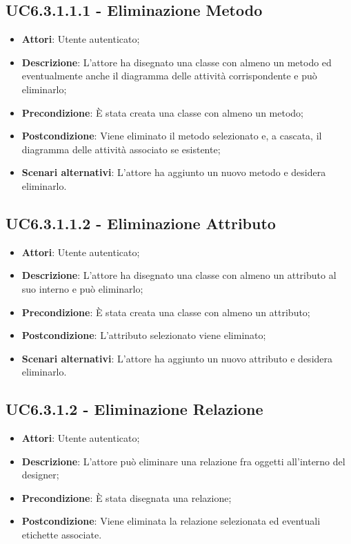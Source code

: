 \subsection{UC6.3.1.1.1 - Eliminazione Metodo} 
\label{ssec:UC6.3.1.1.1} 
\begin{itemize} 
\item \textbf{Attori}: Utente autenticato;
\item \textbf{Descrizione}: L'attore ha disegnato una classe con almeno un metodo ed  eventualmente anche il diagramma delle attività corrispondente e può eliminarlo;
\item \textbf{Precondizione}: È stata creata una classe con almeno un metodo;
\item \textbf{Postcondizione}: Viene eliminato il metodo selezionato e, a cascata, il diagramma delle attività associato se esistente;
\item \textbf{Scenari alternativi}: L'attore ha aggiunto un nuovo metodo e desidera eliminarlo.
\end{itemize} 
\subsection{UC6.3.1.1.2 - Eliminazione Attributo} 
\label{ssec:UC6.3.1.1.2} 
\begin{itemize} 
\item \textbf{Attori}: Utente autenticato;
\item \textbf{Descrizione}: L'attore ha disegnato una classe con almeno un attributo al suo interno e può eliminarlo;
\item \textbf{Precondizione}: È stata creata una classe con almeno un attributo;
\item \textbf{Postcondizione}: L'attributo selezionato viene eliminato;
\item \textbf{Scenari alternativi}: L'attore ha aggiunto un nuovo attributo e desidera eliminarlo.
\end{itemize} 
\subsection{UC6.3.1.2 - Eliminazione Relazione} 
\label{ssec:UC6.3.1.2} 
\begin{itemize} 
\item \textbf{Attori}: Utente autenticato;
\item \textbf{Descrizione}: L'attore può eliminare una relazione fra oggetti all'interno del designer;
\item \textbf{Precondizione}: È stata disegnata una relazione;
\item \textbf{Postcondizione}: Viene eliminata la relazione selezionata ed eventuali etichette associate.
\end{itemize} 
